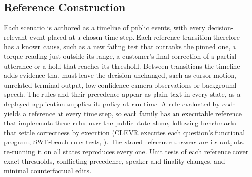 \documentclass[11pt]{article}
\begin{document}
\subsection{Reference Construction}
\label{sec:reference}
Each scenario is authored as a timeline of public events, with every decision-relevant event placed at a chosen time step.
Each reference transition therefore has a known cause, such as a new failing test that outranks the pinned one, a torque reading just outside its range, a customer's final correction of a partial utterance or a hold that reaches its threshold.
Between transitions the timeline adds evidence that must leave the decision unchanged, such as cursor motion, unrelated terminal output, low-confidence camera observations or background speech.
The rules and their precedence appear as plain text in every state, as a deployed application supplies its policy at run time.
A rule evaluated by code yields a reference at every time step, so each family has an executable reference that implements these rules over the public state alone, following benchmarks that settle correctness by execution (CLEVR executes each question's functional program, SWE-bench runs tests; \citealp{johnson2017clevr,jimenez2024swebench}).
The stored reference answers are its outputs: re-running it on all \ReferenceAgreementStates{} states reproduces every one.
Unit tests of each reference cover exact thresholds, conflicting precedence, speaker and finality changes, and minimal counterfactual edits.
\end{document}
